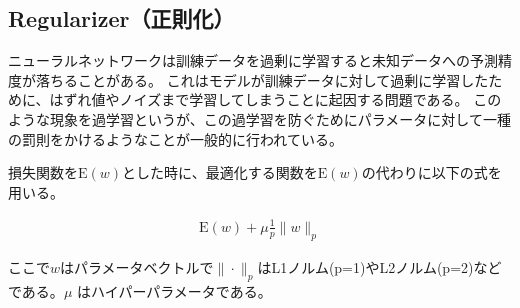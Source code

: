 \subsection{Regularizer（正則化）}
ニューラルネットワークは訓練データを過剰に学習すると未知データへの予測精度が落ちることがある。
これはモデルが訓練データに対して過剰に学習したために、はずれ値やノイズまで学習してしまうことに起因する問題である。
このような現象を過学習というが、この過学習を防ぐためにパラメータに対して一種の罰則をかけるようなことが一般的に行われている。

損失関数を$ \mathrm{E}(w) $とした時に、最適化する関数を$\mathrm{E}(w)$の代わりに以下の式を用いる。

\begin{eqnarray}
\mathrm{E}(w) + \mu \frac{1}{p}\|w\|_p
\label{eq:regu}
\end{eqnarray}


ここで$ w $はパラメータベクトルで$　\| \cdot \|_p $はL1ノルム(p=1)やL2ノルム(p=2)などである。$ \mu $ はハイパーパラメータである。



